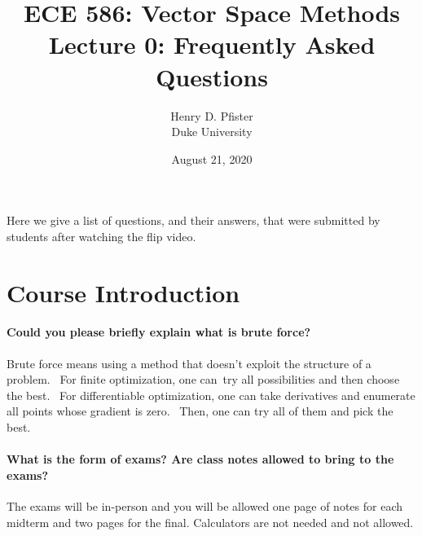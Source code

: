 \documentclass[10pt,english]{article}
\begin{document}
\title{ECE 586: Vector Space Methods \\ Lecture 0: Frequently Asked Questions}
\author{Henry D. Pfister \\ Duke University}
\date{August 21, 2020}

\maketitle

Here we give a list of questions, and their answers, that were submitted by students after watching the flip video.

\section{Course Introduction}

\paragraph{Could you please briefly explain what is brute force?}

Brute force means using a method that doesn't exploit the structure of a problem.  For finite optimization, one can try all possibilities and then choose the best.  For differentiable optimization, one can take derivatives and enumerate all points whose gradient is zero.  Then, one can try all of them and pick the best.

\paragraph{What is the form of exams? Are class notes allowed to bring to the exams?}

The exams will be in-person and you will be allowed one page of notes for each midterm and two pages for the final.
Calculators are not needed and not allowed.

\end{document}
